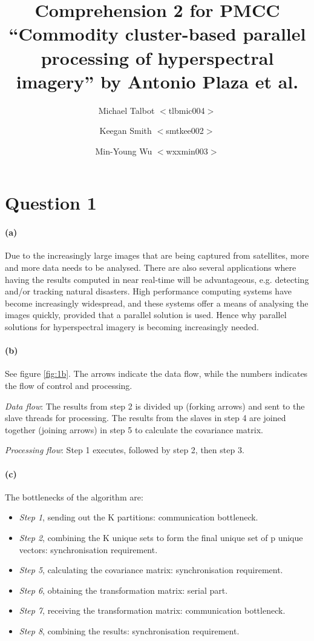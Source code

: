 \documentclass{article}
\title{Comprehension 2 for PMCC \\ \small ``Commodity cluster-based parallel
  processing of hyperspectral imagery'' by Antonio Plaza et al.}
\author{Michael Talbot \small $<$tlbmic004$>$ \and Keegan Smith \small
  $<$smtkee002$>$ \and Min-Young Wu \small $<$wxxmin003$>$}
\begin{document}
\maketitle

\section*{Question 1}

\paragraph{(a)}
Due to the increasingly large images that are being captured from satellites,
more and more data needs to be analysed. There are also several applications
where having the results computed in near real-time will be advantageous,
e.g. detecting and/or tracking natural disasters. High performance computing
systems have become increasingly widespread, and these systems offer a means
of analysing the images quickly, provided that a parallel solution is
used. Hence why parallel solutions for hyperspectral imagery is becoming
increasingly needed.

\paragraph{(b)}
See figure \ref{fig:1b}. The arrows indicate the data flow, while the numbers
indicates the flow of control and processing.

\emph{Data flow}: The results from step 2 is divided up (forking arrows) and
sent to the slave threads for processing. The results from the slaves in step
4 are joined together (joining arrows) in step 5 to calculate the covariance
matrix.

\emph{Processing flow}: Step 1 executes, followed by step 2, then step 3.

\paragraph{(c)}
The bottlenecks of the algorithm are:
\begin{itemize}
\item \emph{Step 1}, sending out the K partitions: communication bottleneck.
\item \emph{Step 2}, combining the K unique sets to form the final unique set
  of p unique vectors: synchronisation requirement.
\item \emph{Step 5}, calculating the covariance matrix: synchronisation
  requirement.
\item \emph{Step 6}, obtaining the transformation matrix: serial part.
\item \emph{Step 7}, receiving the transformation matrix: communication
  bottleneck.
\item \emph{Step 8}, combining the results: synchronisation requirement.
\end{itemize}
\end{document}
